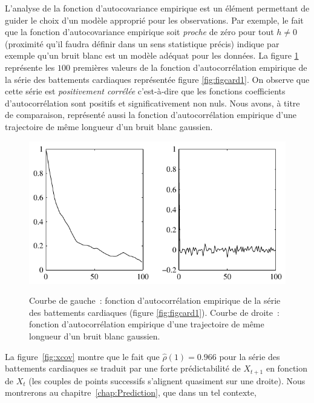 L'analyse de la fonction d'autocovariance empirique est un \'el\'ement
permettant de guider le choix d'un mod\`ele appropri\'e pour les
observations. Par exemple, le fait que la fonction
d'autocovariance empirique soit \emph{proche} de z\'ero pour tout
$h \ne 0$ (proximit\'e qu'il faudra d\'efinir dans un sens statistique
pr\'ecis) indique par exemple qu'un bruit blanc est un mod\`ele
ad\'equat pour les donn\'ees. La figure \ref{fig:xcorrhr} repr\'esente
les $100$ premi\`eres valeurs de la fonction d'autocorr\'elation
empirique de la s\'erie des battements cardiaques repr\'esent\'ee figure
\ref{fig:figcard1}. On observe que cette s\'erie est
\emph{positivement corr\'el\'ee} c'est-\`a-dire que les fonctions
coefficients d'autocorr\'elation sont positifs et significativement
non nuls. Nous avons, \`a titre de comparaison, repr\'esent\'e aussi la
fonction d'autocorr\'elation empirique d'une trajectoire de m\^{e}me
longueur d'un bruit blanc gaussien.
\begin{figure}
  \centering
  \includegraphics[width=\textwidth]{Figures/corrHR11839}\\
  \caption{Courbe de gauche~: fonction d'autocorr\'elation empirique de la s\'erie
 des battements cardiaques (figure \ref{fig:figcard1}). Courbe de droite~:
 fonction d'autocorr\'elation
 empirique d'une trajectoire de m\^{e}me longueur d'un bruit blanc
 gaussien.}\label{fig:xcorrhr}
\end{figure}
 La figure~\ref{fig:xcov} montre que le fait que $\hat{\rho}(1)
 = 0.966$ pour la s\'erie des battements cardiaques se traduit par une forte
 pr\'edictabilit\'e de $X_{t+1}$ en fonction de $X_t$ (les couples de points
 successifs s'alignent quasiment sur une droite). Nous montrerons au
 chapitre~\ref{chap:Prediction}, que dans un tel contexte,

